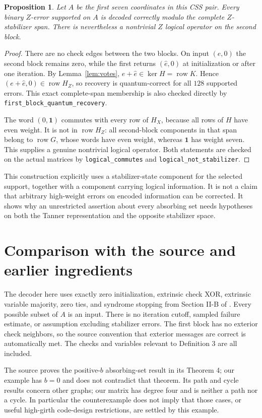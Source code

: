 \documentclass[11pt]{article}
\newtheorem{proposition}[theorem]{Proposition}
\newcommand{\row}{\operatorname{row}}
\begin{document}
\begin{proposition}\label{prop:css}
Let $A$ be the first seven coordinates in this CSS pair. Every binary
$Z$-error supported on $A$ is decoded correctly modulo the complete
$Z$-stabilizer span. There is nevertheless a nontrivial $Z$ logical
operator on the second block.
\end{proposition}
\begin{proof}
There are no check edges between the two blocks. On input $(e,0)$ the
second block remains zero, while the first returns $(\hat e,0)$ at
initialization or after one iteration. By Lemma~\ref{lem:votes},
$e+\hat e\in\ker H=\row K$. Hence
$(e+\hat e,0)\in\row H_Z$, so recovery is quantum-correct for all $128$
supported errors. This exact complete-span membership is also checked
directly by \texttt{first\_block\_quantum\_recovery}.

The word $(0,\mathbf1)$ commutes with every row of $H_X$, because all rows
of $H$ have even weight. It is not in $\row H_Z$: all second-block
components in that span belong to $\row G$, whose words have even weight,
whereas $\mathbf1$ has weight seven. This supplies a genuine nontrivial
logical operator. Both statements are checked on the actual matrices by
\texttt{logical\_commutes} and \texttt{logical\_not\_stabilizer}.
\end{proof}
This construction explicitly uses a stabilizer-state component for the
selected support, together with a component carrying logical information.
It is not a claim that arbitrary high-weight errors on encoded information
can be corrected. It shows why an unrestricted assertion about every
absorbing set needs hypotheses on both the Tanner representation and the
opposite stabilizer space.

\section{Comparison with the source and earlier ingredients}\label{sec:meaning}
The decoder here uses exactly zero initialization, extrinsic check XOR,
extrinsic variable majority, zero ties, and syndrome stopping from Section
II-B of \cite{mpk}. Every possible subset of $A$ is an input. There is no
iteration cutoff, sampled failure estimate, or assumption excluding
stabilizer errors. The first block has no exterior check neighbors, so the
source convention that exterior messages are correct is automatically met.
The checks and variables relevant to Definition 3 are all included.

The source proves the positive-$b$ absorbing-set result in its Theorem 4;
our example has $b=0$ and does not contradict that theorem. Its path and
cycle results concern other graphs; our matrix has degree four and is
neither a path nor a cycle. In particular the counterexample does not
imply that those cases, or useful high-girth code-design restrictions,
are settled by this example.
\end{document}
